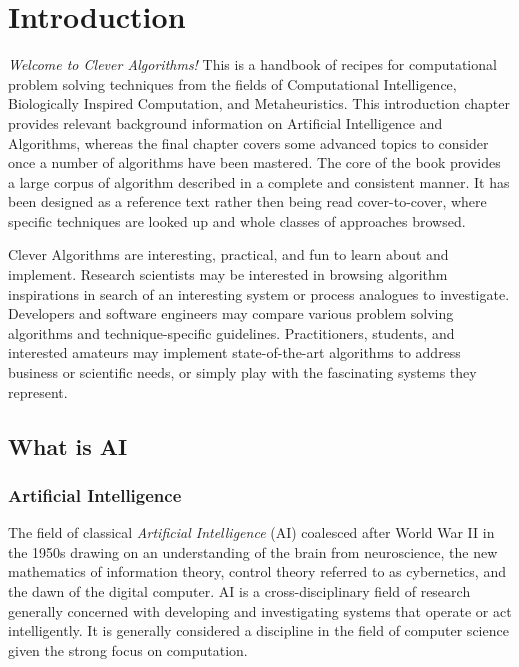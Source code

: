 

\chapter{Introduction}
\label{chap:intro}
\emph{Welcome to Clever Algorithms!} This is a handbook of recipes for computational problem solving techniques from the fields of Computational Intelligence, Biologically Inspired Computation, and Metaheuristics. 
This introduction chapter provides relevant background information on Artificial Intelligence and Algorithms, whereas the final chapter covers some advanced topics to consider once a number of algorithms have been mastered. The core of the book provides a large corpus of algorithm described in a complete and consistent manner. It has been designed as a reference text rather then being read cover-to-cover, where specific techniques are looked up and whole classes of approaches browsed. 

Clever Algorithms are interesting, practical, and fun to learn about and implement.
Research scientists may be interested in browsing algorithm inspirations in search of an interesting system or process analogues to investigate. Developers and software engineers may compare various problem solving algorithms and technique-specific guidelines. Practitioners, students, and interested amateurs may implement state-of-the-art algorithms to address business or scientific needs, or simply play with the fascinating systems they represent.


% 
% 
\section{What is AI}
\label{intro:sec:what_is_ai}
% 
% 
\subsection{Artificial Intelligence}
\label{sec:artificial_intelligence}
The field of classical \emph{Artificial Intelligence} (AI) coalesced after World War II in the 1950s drawing on an understanding of the brain from neuroscience, the new mathematics of information theory, control theory referred to as cybernetics, and the dawn of the digital computer. AI is a cross-disciplinary field of research generally concerned with developing and investigating systems that operate or act intelligently. It is generally considered a discipline in the field of computer science given the strong focus on computation.


